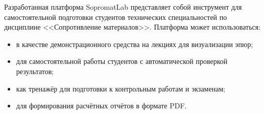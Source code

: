 Разработанная платформа SopromatLab представляет собой инструмент для самостоятельной подготовки студентов технических специальностей по дисциплине <<Сопротивление материалов>>. Платформа может использоваться:
\begin{itemize}
  \item в качестве демонстрационного средства на лекциях для визуализации эпюр;
  \item для самостоятельной работы студентов с автоматической проверкой результатов;
  \item как тренажёр для подготовки к контрольным работам и экзаменам;
  \item для формирования расчётных отчётов в формате PDF.
\end{itemize}
